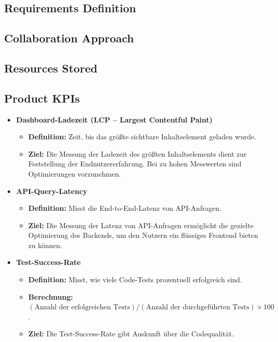 \documentclass{article}
\begin{document}
\subsection{Requirements Definition}

\subsection{Collaboration Approach}

\subsection{Resources Stored}







\subsection{Product KPIs}

\begin{itemize}
  \item \textbf{Dashboard-Ladezeit (LCP – Largest Contentful Paint)}
    \begin{itemize}
      \item \textbf{Definition:} Zeit, bis das größte sichtbare Inhaltselement geladen wurde.
      \item \textbf{Ziel:} Die Messung der Ladezeit des größten Inhaltselements dient zur Feststellung der Endnutzererfahrung. Bei zu hohen Messwerten sind Optimierungen vorzunehmen.
    \end{itemize}

  \item \textbf{API-Query-Latency}
    \begin{itemize}
      \item \textbf{Definition:} Misst die End-to-End-Latenz von API-Anfragen.
      \item \textbf{Ziel:} Die Messung der Latenz von API-Anfragen ermöglicht die gezielte Optimierung des Backends, um den Nutzern ein flüssiges Frontend bieten zu können.
    \end{itemize}

  \item \textbf{Test-Success-Rate}
    \begin{itemize}
      \item \textbf{Definition:} Misst, wie viele Code-Tests prozentuell erfolgreich sind.
      \item \textbf{Berechnung:} \((\text{Anzahl der erfolgreichen Tests}) / (\text{Anzahl der durchgeführten Tests}) \times 100\).
      \item \textbf{Ziel:} Die Test-Success-Rate gibt Auskunft über die Codequalität.
    \end{itemize}
\end{itemize}
\end{document}
